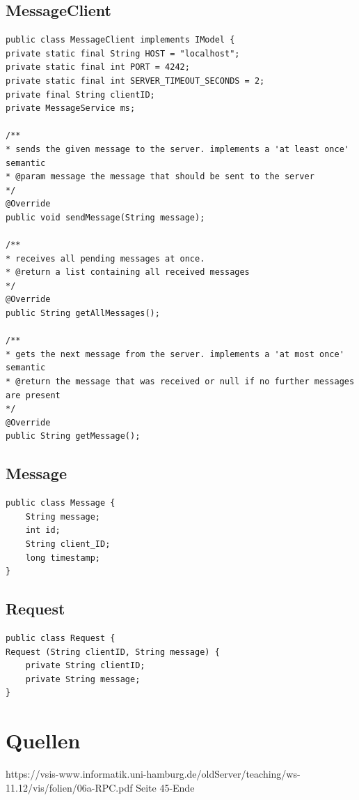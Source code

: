 \documentclass[a4paper, 12pt]{scrartcl}
\begin{document}
\subsection{MessageClient}
\begin{lstlisting}
public class MessageClient implements IModel {
private static final String HOST = "localhost";
private static final int PORT = 4242;
private static final int SERVER_TIMEOUT_SECONDS = 2;
private final String clientID;
private MessageService ms;

/**
* sends the given message to the server. implements a 'at least once' semantic
* @param message the message that should be sent to the server
*/
@Override
public void sendMessage(String message);

/**
* receives all pending messages at once.
* @return a list containing all received messages
*/
@Override
public String getAllMessages();

/**
* gets the next message from the server. implements a 'at most once' semantic
* @return the message that was received or null if no further messages are present
*/
@Override
public String getMessage();
\end{lstlisting}

\subsection{Message}
\begin{lstlisting}
public class Message {
	String message;
	int id;
	String client_ID;
	long timestamp;
}
\end{lstlisting}

\subsection{Request}
\begin{lstlisting}
public class Request {
Request (String clientID, String message) {
	private String clientID;
	private String message;
}
\end{lstlisting}

\newpage	
\section{Quellen}
https://vsis-www.informatik.uni-hamburg.de/oldServer/teaching/ws-11.12/vis/folien/06a-RPC.pdf Seite 45-Ende
\end{document}
